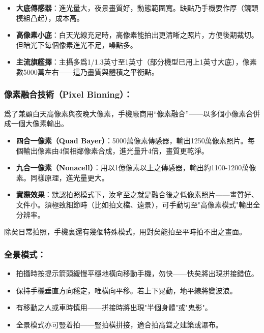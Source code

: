 \begin{itemize}
  \item \textbf{大底傳感器}：進光量大，夜景畫質好，動態範圍寬。缺點乃手機要作厚（鏡頭模組凸起），成本高。
  \item \textbf{高像素小底}：白天光線充足時，高像素能拍出更清晰之照片，方便後期裁切。但暗光下每個像素進光不足，噪點多。
  \item \textbf{主流旗艦擇}：主攝多爲1/1.3英寸至1英寸（部分機型已用上1英寸大底），像素數5000萬左右——這乃畫質與體積之平衡點。
\end{itemize}

\subsubsection*{像素融合技術（Pixel Binning）：}

爲了兼顧白天高像素與夜晚大像素，手機廠商用“像素融合”——以多個小像素合併成一個大像素輸出。

\begin{itemize}
  \item \textbf{四合一像素（Quad Bayer）}：5000萬像素傳感器，輸出1250萬像素照片。每個輸出像素由4個相鄰像素合成，進光量升4倍，畫質更乾淨。
  \item \textbf{九合一像素（Nonacell）}：用以1億像素以上之傳感器，輸出約1100-1200萬像素。同樣原理，進光量更大。
  \item \textbf{實際效果}：默認拍照模式下，汝拿至之就是融合後之低像素照片——畫質好、文件小。須極致細節時（比如拍文檔、遠景），可手動切至"高像素模式"輸出全分辨率。
\end{itemize}


除矣日常拍照，手機裏還有幾個特殊模式，用對矣能拍至平時拍不出之畫面。

\subsubsection*{全景模式：}

\begin{itemize}
  \item 拍攝時按提示箭頭緩慢平穩地橫向移動手機，勿快——快矣將出現拼接錯位。
  \item 保持手機垂直方向穩定，唯橫向平移。若上下晃動，地平線將變波浪。
  \item 有移動之人或車時慎用——拼接時將出現"半個身體"或"鬼影"。
  \item 全景模式亦可豎着拍——豎拍橫拼接，適合拍高聳之建築或瀑布。
\end{itemize}

